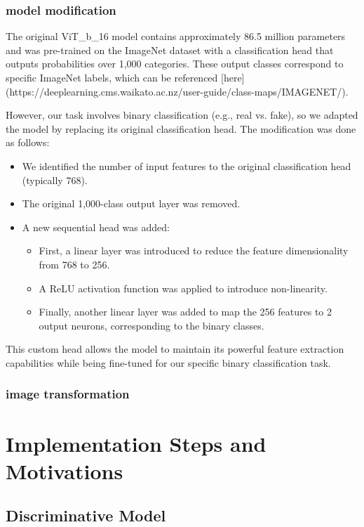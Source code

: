 \documentclass[a4paper,11pt]{article}
\begin{document}
\subsubsection*{model modification}                        
The original ViT\_b\_16 model contains approximately 86.5 million parameters and was pre-trained on the ImageNet dataset with a classification head that outputs probabilities over 1,000 categories. These output classes correspond to specific ImageNet labels, which can be referenced [here](https://deeplearning.cms.waikato.ac.nz/user-guide/class-maps/IMAGENET/).

However, our task involves binary classification (e.g., real vs. fake), so we adapted the model by replacing its original classification head. The modification was done as follows:

\begin{itemize}
    \item We identified the number of input features to the original classification head (typically 768).
    \item The original 1,000-class output layer was removed.
    \item A new sequential head was added:
    \begin{itemize}
        \item First, a linear layer was introduced to reduce the feature dimensionality from 768 to 256.
        \item A ReLU activation function was applied to introduce non-linearity.
        \item Finally, another linear layer was added to map the 256 features to 2 output neurons, corresponding to the binary classes.
    \end{itemize}
\end{itemize}

This custom head allows the model to maintain its powerful feature extraction capabilities while being fine-tuned for our specific binary classification task.

\subsubsection*{image transformation}

\section{Implementation Steps and Motivations}
\subsection{Discriminative Model}
\end{document}

